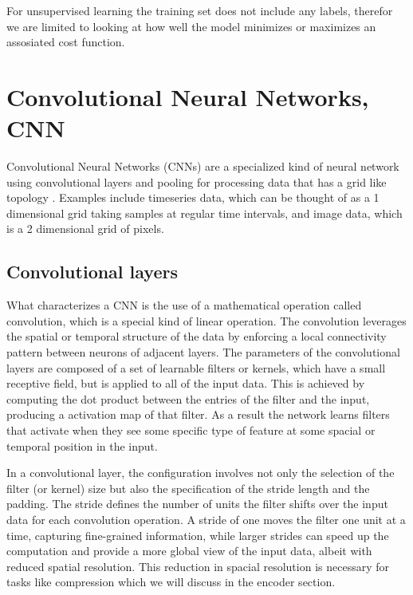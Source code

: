 For unsupervised learning the training set does not include any labels, therefor we are limited to looking at how well the model minimizes or maximizes an assosiated cost function. 


\section{Convolutional Neural Networks, CNN}
Convolutional Neural Networks (CNNs)\cite{CNNs}  are a specialized kind of neural network using convolutional layers and pooling for processing data that has a grid like topology . Examples include timeseries data, which can be thought of as a 1 dimensional grid taking samples at regular time intervals, and image data, which is a 2 dimensional grid of pixels. 

\subsection{Convolutional layers}


What characterizes a CNN is the use of a mathematical operation called convolution, which is a special kind of linear operation. The convolution leverages the spatial or temporal structure of the data by enforcing a local connectivity pattern between neurons of adjacent layers.
The parameters of the convolutional layers are composed of a set of learnable filters or kernels, which have a small receptive field, but is applied to all of the input data. This is achieved by computing the dot product between the entries of the filter and the input, producing a activation map of that filter.
As a result the network learns filters that activate when they see some specific type of feature at some spacial or temporal position in the input. 



In a convolutional layer, the configuration involves not only the selection of the filter (or kernel) size but also the specification of the stride length and the padding. The stride defines the number of units the filter shifts over the input data for each convolution operation. A stride of one moves the filter one unit at a time, capturing fine-grained information, while larger strides can speed up the computation and provide a more global view of the input data, albeit with reduced spatial resolution.
This reduction in spacial resolution is necessary for tasks like compression which we will discuss in the encoder section.

